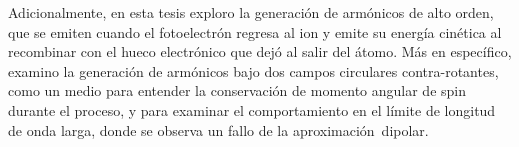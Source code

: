 \vspace{\abstskip}
\noindent
Adicionalmente, en esta tesis exploro la generación de armónicos de alto orden, que se emiten cuando el fotoelectrón regresa al ion y emite su energía cinética al recombinar con el hueco electrónico que dejó al salir del átomo. Más en específico, examino la generación de armónicos bajo dos campos circulares contra-rotantes, como un medio para entender la conservación de momento angular de spin durante el proceso, y para examinar el comportamiento en el límite de longitud de onda larga, donde se observa un fallo de la aproximación~dipolar.


































